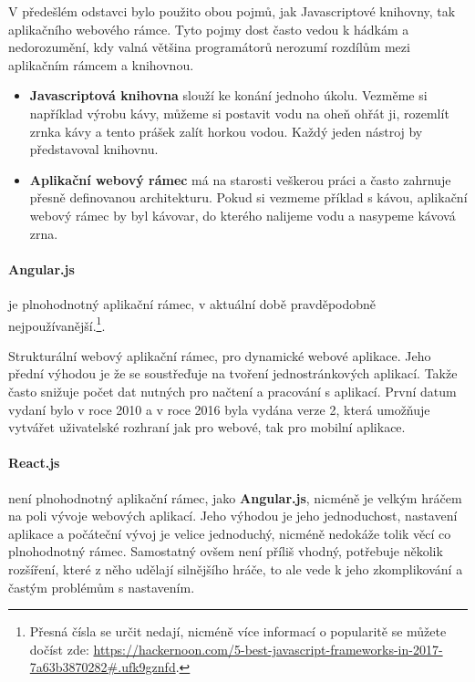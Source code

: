 \par V předešlém odstavci bylo použito obou pojmů, jak Javascriptové knihovny, tak aplikačního webového rámce. Tyto pojmy dost často vedou k hádkám a nedorozumění, kdy valná většina programátorů nerozumí rozdílům mezi aplikačním rámcem a knihovnou.
\begin{itemize}
\item \textbf{Javascriptová knihovna} slouží ke konání jednoho úkolu. Vezměme si například výrobu kávy, můžeme si postavit vodu na oheň ohřát ji, rozemlít zrnka kávy a tento prášek zalít horkou vodou. Každý jeden nástroj by představoval knihovnu.
\item \textbf{Aplikační webový rámec} má na starosti veškerou práci a často zahrnuje přesně definovanou architekturu. Pokud si vezmeme příklad s kávou, aplikační webový rámec by byl kávovar, do kterého nalijeme vodu a nasypeme kávová zrna. \cite{framework-vs-library}
\end{itemize}

\paragraph{Angular.js} je plnohodnotný aplikační rámec, v aktuální době pravděpodobně nejpoužívanější.\footnote{Přesná čísla se určit nedají, nicméně více informací o popularitě se můžete dočíst zde: \url{https://hackernoon.com/5-best-javascript-frameworks-in-2017-7a63b3870282\#.ufk9gznfd}.}.

\par Strukturální webový aplikační rámec, pro dynamické webové aplikace. Jeho přední výhodou je že se soustřeďuje na tvoření jednostránkových aplikací. Takže často snižuje počet dat nutných pro načtení a pracování s aplikací. První datum vydaní bylo v roce 2010 a v roce 2016 byla vydána verze 2, která umožňuje vytvářet uživatelské rozhraní jak pro webové, tak pro mobilní aplikace.\cite{angular-js}

\paragraph{React.js} není plnohodnotný aplikační rámec, jako \textbf{Angular.js}, nicméně je velkým hráčem na poli vývoje webových aplikací. Jeho výhodou je jeho jednoduchost, nastavení aplikace a počáteční vývoj je velice jednoduchý, nicméně nedokáže tolik věcí co plnohodnotný rámec. Samostatný ovšem není příliš vhodný, potřebuje několik rozšíření, které z něho udělají silnějšího hráče, to ale vede k jeho zkomplikování  a častým problémům s nastavením. \cite{react-js}


